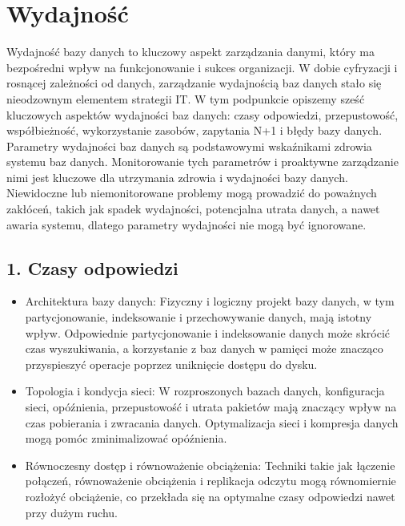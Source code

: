 \documentclass[letterpaper,10pt,polish]{sphinxmanual}
\begin{document}
\sphinxstepscope


\chapter{Wydajność}
\label{\detokenize{rozdzialy/rozdzial3:wydajnosc}}\label{\detokenize{rozdzialy/rozdzial3::doc}}
\sphinxAtStartPar
Wydajność bazy danych to kluczowy aspekt zarządzania danymi, który ma bezpośredni wpływ na funkcjonowanie i sukces organizacji. W dobie cyfryzacji i rosnącej zależności od danych, zarządzanie wydajnością baz danych stało się nieodzownym elementem strategii IT. W tym podpunkcie opiszemy sześć kluczowych aspektów wydajności baz danych: czasy odpowiedzi, przepustowość, współbieżność, wykorzystanie zasobów, zapytania N+1 i błędy bazy danych.
Parametry wydajności baz danych są podstawowymi wskaźnikami zdrowia systemu baz danych. Monitorowanie tych parametrów i proaktywne zarządzanie nimi jest kluczowe dla utrzymania zdrowia i wydajności bazy danych. Niewidoczne lub niemonitorowane problemy mogą prowadzić do poważnych zakłóceń, takich jak spadek wydajności, potencjalna utrata danych, a nawet awaria systemu, dlatego parametry wydajności nie mogą być ignorowane.


\section{1. Czasy odpowiedzi}
\label{\detokenize{rozdzialy/rozdzial3:czasy-odpowiedzi}}\begin{description}
\begin{itemize}
\item {} 
\sphinxAtStartPar
Architektura bazy danych: Fizyczny i logiczny projekt bazy danych, w tym partycjonowanie, indeksowanie i przechowywanie danych, mają istotny wpływ. Odpowiednie partycjonowanie i indeksowanie danych może skrócić czas wyszukiwania, a korzystanie z baz danych w pamięci może znacząco przyspieszyć operacje poprzez uniknięcie dostępu do dysku.

\item {} 
\sphinxAtStartPar
Topologia i kondycja sieci: W rozproszonych bazach danych, konfiguracja sieci, opóźnienia, przepustowość i utrata pakietów mają znaczący wpływ na czas pobierania i zwracania danych. Optymalizacja sieci i kompresja danych mogą pomóc zminimalizować opóźnienia.

\item {} 
\sphinxAtStartPar
Równoczesny dostęp i równoważenie obciążenia: Techniki takie jak łączenie połączeń, równoważenie obciążenia i replikacja odczytu mogą równomiernie rozłożyć obciążenie, co przekłada się na optymalne czasy odpowiedzi nawet przy dużym ruchu.

\end{itemize}

\end{description}
\end{document}
